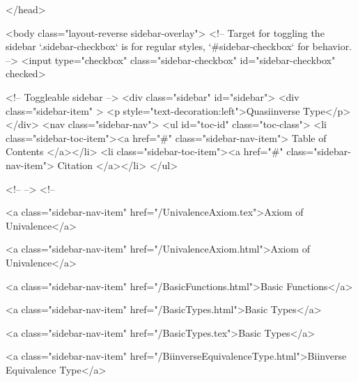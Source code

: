   
</head>




  <body class="layout-reverse sidebar-overlay">
    <!-- Target for toggling the sidebar `.sidebar-checkbox` is for regular
     styles, `#sidebar-checkbox` for behavior. -->
<input type="checkbox" class="sidebar-checkbox" id="sidebar-checkbox" checked>

<!-- Toggleable sidebar -->
<div class="sidebar" id="sidebar">
  <div class="sidebar-item" >
    <p style="text-decoration:left">Quasiinverse Type</p>
  </div>
  <nav class="sidebar-nav">
    <ul id="toc-id" class="toc-class">
  <li class="sidebar-toc-item"><a href="#" class="sidebar-nav-item"> Table of Contents </a></li>
  <li class="sidebar-toc-item"><a href="#" class="sidebar-nav-item"> Citation </a></li>
</ul>


    <!--  -->
    <!-- 
      
    
      
    
      
    
      
    
      
        
      
    
      
        
          <a class="sidebar-nav-item" href="/UnivalenceAxiom.tex">Axiom of Univalence</a>
        
      
    
      
        
          <a class="sidebar-nav-item" href="/UnivalenceAxiom.html">Axiom of Univalence</a>
        
      
    
      
        
          <a class="sidebar-nav-item" href="/BasicFunctions.html">Basic Functions</a>
        
      
    
      
        
          <a class="sidebar-nav-item" href="/BasicTypes.html">Basic Types</a>
        
      
    
      
        
          <a class="sidebar-nav-item" href="/BasicTypes.tex">Basic Types</a>
        
      
    
      
        
          <a class="sidebar-nav-item" href="/BiinverseEquivalenceType.html">Biinverse Equivalence Type</a>
        
